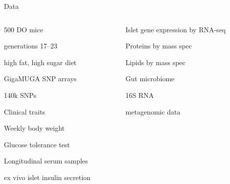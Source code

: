 \documentclass[aspectratio=169,12pt,t]{beamer}
\begin{document}
\begin{frame}[c]{Data}


  \begin{columns}
    \begin{column}{0.45\textwidth}
      \bbi
    \item 500 DO mice
      \bi
    \item generations 17--23
    \item high fat, high sugar diet
      \ei
    \item GigaMUGA SNP arrays
      \bi
    \item 140k SNPs
      \ei
    \item Clinical traits
      \bi
    \item Weekly body weight
    \item Glucose tolerance test
    \item Longitudinal serum samples
    \item ex vivo islet insulin secretion
      \ei
      \ei
    \end{column}

    \begin{column}{0.45\textwidth}
      \bbi
    \item Islet gene expression by RNA-seq
    \item Proteins by mass spec
    \item Lipids by mass spec
    \item Gut microbiome
      \bi
    \item 16S RNA
    \item metagenomic data
      \ei
      \ei

    \end{column}
  \end{columns}


\end{frame}
\end{document}
